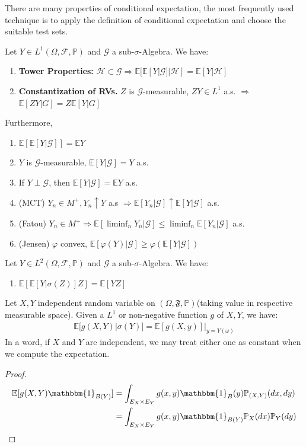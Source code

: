 There are many properties of conditional expectation, the most frequently used technique is to apply the definition of conditional expectation and choose the suitable test sets.

\begin{theorem}
Let $Y \in L^1(\Omega, \mathcal{F}, \mathbb{P})$ and $\mathcal{G}$ a sub-$\sigma$-Algebra. We have:
\begin{enumerate}
	\item \textbf{Tower Properties: }$\mathcal{H} \subset \mathcal{G} \Rightarrow \mathbb{E}[\mathbb{E}[Y|\mathcal{G}]|\mathcal{H}] = \mathbb{E}[Y|\mathcal{H}]$ 
	\item \textbf{Constantization of RVs.} $Z$ is $\mathcal{G}$-measurable, $ZY \in L^1$ a.s. $\Rightarrow$ $\mathbb{E}[ZY|G] = Z\mathbb{E}[Y|G]$
\end{enumerate}
Furthermore, 
\begin{enumerate}
	\item $\mathbb{E}[\mathbb{E}[ Y|\mathcal{G}]] = \mathbb{E}Y$  
	\item $Y$ is $\mathcal{G}$-measurable, $\mathbb{E}[Y|\mathcal{G}] = Y$ a.s.
	\item If $Y \perp \mathcal{G}$, then $\mathbb{E}[Y|\mathcal{G}] = \mathbb{E}Y$ a.s.
	\item(MCT) $Y_n \in M^+, Y_n \uparrow Y$ a.s $\Rightarrow \mathbb{E}[Y_n|\mathcal{G}] \uparrow \mathbb{E}[Y| \mathcal{G}]$ a.s.
	\item(Fatou) $Y_n \in M^+ \Rightarrow \mathbb{E}[\liminf_n Y_n|\mathcal{G}] \leq \liminf_n \mathbb{E}[Y_n | \mathcal{G}]$ a.s.
	\item(Jensen) $\varphi$ convex,  $\mathbb{E}[\varphi(Y)|\mathcal{G}] \geq \varphi(\mathbb{E}[Y|\mathcal{G}])$
\end{enumerate}
	Let $Y \in L^2(\Omega, \mathcal{F}, \mathbb{P})$ and $\mathcal{G}$ a sub-$\sigma$-Algebra. We have:
	\begin{enumerate}
		\item $\mathbb{E}[\mathbb{E}[Y|\sigma(Z)]Z] = \mathbb{E}[YZ]$
	\end{enumerate}
\end{theorem}

\begin{theorem}
Let $X, Y$ independent random variable on $(\Omega, \mathfrak{F}, \mathbb{P})$(taking value in respective measurable space). Given a $L^1$ or non-negative function $g$ of $X, Y$, we have:
\begin{align*}
	\mathbb{E}[g(X,Y)|\sigma(Y)] = \mathbb{E}[g(X, y)]|_{y = Y(\omega)}
\end{align*}
In a word, if $X$ and $Y$ are independent, we may treat either one as constant when we compute the expectation.
\end{theorem}
\begin{proof}
	\begin{align*}
		\mathbb{E}[g(X, Y)\mathbbm{1}_{B(Y)}] &= \int_{E_X \times E_Y} g(x, y) \mathbbm{1}_{B}(y)\mathbb{P}_{(X, Y)}(dx, dy)\\
		&= \int_{E_X \times E_Y} g(x, y)\mathbbm{1}_{B(Y)}\mathbb{P}_X(dx)\mathbb{P}_Y(dy)
	\end{align*}
\end{proof}

